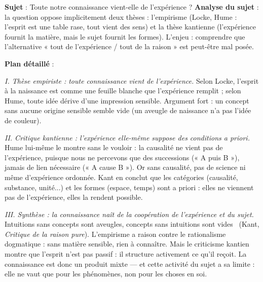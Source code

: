 \documentclass[11pt]{article}
\begin{document}
\begin{exoresolu}
\textbf{Sujet} : Toute notre connaissance vient-elle de l'expérience ?
\tcblower
\textbf{Analyse du sujet} : la question oppose implicitement deux thèses : l'empirisme (Locke, Hume : l'esprit est une table rase, tout vient des sens) et la thèse kantienne (l'expérience fournit la matière, mais le sujet fournit les formes). L'enjeu : comprendre que l'alternative « tout de l'expérience / tout de la raison » est peut-être mal posée.

\textbf{Plan détaillé} :

\emph{I. Thèse empiriste : toute connaissance vient de l'expérience.}
Selon Locke, l'esprit à la naissance est comme une feuille blanche que l'expérience remplit ; selon Hume, toute idée dérive d'une impression sensible. Argument fort : un concept sans aucune origine sensible semble vide (un aveugle de naissance n'a pas l'idée de couleur).

\emph{II. Critique kantienne : l'expérience elle-même suppose des conditions a priori.}
Hume lui-même le montre sans le vouloir : la causalité ne vient pas de l'expérience, puisque nous ne percevons que des successions (« A puis B »), jamais de lien nécessaire (« A cause B »). Or sans causalité, pas de science ni même d'expérience ordonnée. Kant en conclut que les catégories (causalité, substance, unité...) et les formes (espace, temps) sont a priori : elles ne viennent pas de l'expérience, elles la rendent possible.

\emph{III. Synthèse : la connaissance naît de la coopération de l'expérience et du sujet.}
\guillemotleft Intuitions sans concepts sont aveugles, concepts sans intuitions sont vides \guillemotright\ (Kant, \emph{Critique de la raison pure}). L'empirisme a raison contre le rationalisme dogmatique : sans matière sensible, rien à connaître. Mais le criticisme kantien montre que l'esprit n'est pas passif : il structure activement ce qu'il reçoit. La connaissance est donc un produit mixte — et cette activité du sujet a sa limite : elle ne vaut que pour les phénomènes, non pour les choses en soi.
\end{exoresolu}
\end{document}
